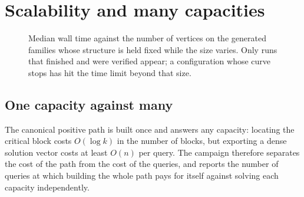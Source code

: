 \section{Scalability and many capacities}
\label{sec:scalability}


\begin{figure}[tbp]
  \centering
  \caption{Median wall time against the number of vertices on the generated
  families whose structure is held fixed while the size varies. Only runs that
  finished and were verified appear; a configuration whose curve stops has hit
  the time limit beyond that size.}
  \label{fig:scaling}
\end{figure}

\subsection{One capacity against many}


The canonical positive path is built once and answers any capacity: locating the
critical block costs $O(\log k)$ in the number of blocks, but exporting a
dense solution vector costs at least $O(n)$ per query. The campaign therefore
separates the cost of the path from the cost of the queries, and reports the
number of queries at which building the whole path pays for itself against
solving each capacity independently.
